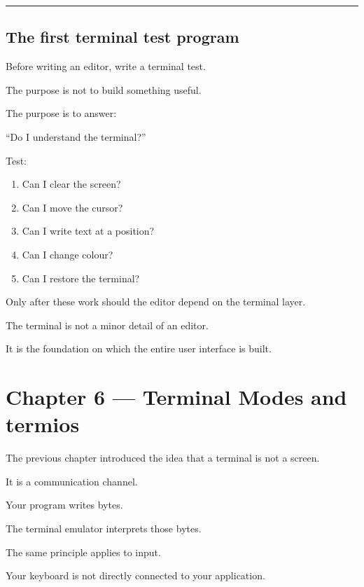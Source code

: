 \documentclass[
  oneside,
  openany]{book}
\begin{document}
\begin{center}\rule{0.5\linewidth}{0.5pt}\end{center}

\hypertarget{the-first-terminal-test-program}{%
\section{The first terminal test
program}\label{the-first-terminal-test-program}}

Before writing an editor, write a terminal test.

The purpose is not to build something useful.

The purpose is to answer:

``Do I understand the terminal?''

Test:

\begin{enumerate}
\def\labelenumi{\arabic{enumi}.}
\item
  Can I clear the screen?
\item
  Can I move the cursor?
\item
  Can I write text at a position?
\item
  Can I change colour?
\item
  Can I restore the terminal?
\end{enumerate}

Only after these work should the editor depend on the terminal layer.

The terminal is not a minor detail of an editor.

It is the foundation on which the entire user interface is built.

\hypertarget{chapter-6-terminal-modes-and-termios}{%
\chapter{Chapter 6 --- Terminal Modes and
termios}\label{chapter-6-terminal-modes-and-termios}}

The previous chapter introduced the idea that a terminal is not a
screen.

It is a communication channel.

Your program writes bytes.

The terminal emulator interprets those bytes.

The same principle applies to input.

Your keyboard is not directly connected to your application.
\end{document}
